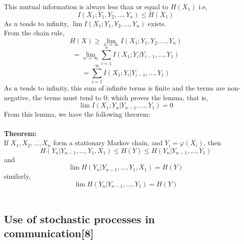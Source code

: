 \documentclass[10pt,twocolumn,letterpaper]{article}
\begin{document}
This mutual information is always less than or equal to \begin{math}
H(X_1) \end{math} i.e, 
\begin{equation*}
    I (X_1 ; Y_1 ,Y_2 , . . . , Y_n  ) \leq H(X_1)
\end{equation*} 
As n tends to infinity, \begin{math}\lim I (X_1 ; Y_1 ,Y_2 , . . . , Y_n ) \end{math}
exists.\\ From the chain rule, 
\begin{equation*}
    H (X) \geq \lim_{n \to \infty} I (X_1 ; Y_1 , Y_2 , . . . , Y_n )
\end{equation*}
\begin{equation*}
    = \lim_{n \to \infty} \sum_{i=1}^{n} I (X_1 ; Y_i |Y_{i-1} , . . . , Y_1 )
\end{equation*}
\begin{equation*}
    = \sum_{i=1}^{\infty} I (X_1 ; Y_i |Y_{i-1} , . . . , Y_1 )
\end{equation*}
As n tends to infinity, this sum of infinite terms is ﬁnite and the terms are non-negative, the terms must tend to 0; which proves the lemma, that is,
\begin{equation*}
    \lim I (X_1 ; Y_n |Y_{n-1} , . . . , Y_1 ) = 0
\end{equation*}
From this lemma, we have the following theorem:\\
\\ \textbf{Theorem:}\\
If \begin{math} X_1 , X_2 , . . . , X_n \end{math} form a stationary Markov chain, and
\begin{math} Y_i = \varphi(X_i ) \end{math}, then 
\begin{equation*}
    H (Y_n |Y_{n-1} , . . . , Y_1 , X_1 ) \leq H ( Y ) \leq H (Y_n |Y_{n-1} , . . . , Y_1 )
\end{equation*}
and
\begin{equation*}
   \lim H (Y_n |Y_{n-1} , . . . , Y_1 , X_1 ) = H ( Y ) 
\end{equation*}
similarly, 
\begin{equation*}
    \lim H (Y_n |Y_{n-1} , . . . , Y_1 ) = H(Y)
\end{equation*}
\begin{math}
\end{math}
\subsection{Use of stochastic processes in communication{\small[8]}}
\end{document}
